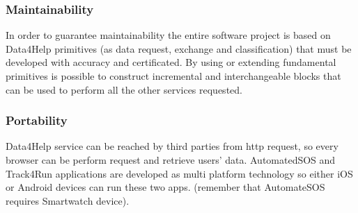 \subsubsection{Maintainability}
In order to guarantee maintainability the entire software project is based on Data4Help primitives (as data request, exchange and classification) that must be developed with accuracy and certificated. By using or extending fundamental primitives is possible to construct incremental and interchangeable blocks that can be used to perform all the other services requested.
\subsubsection{Portability}
Data4Help service can be reached by third parties from http request, so every browser can be perform request and retrieve users' data.
AutomatedSOS and Track4Run applications are developed as multi platform technology so either iOS or Android devices can run these two apps. (remember that AutomateSOS requires Smartwatch device).


